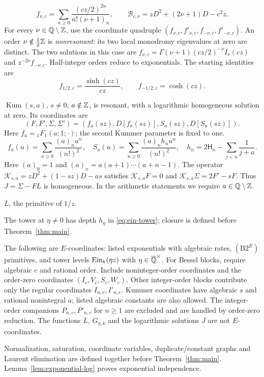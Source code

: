 \begin{description}
\begin{equation}
f_{\nu,c}=\sum_{n\ge0}\frac{(cz/2)^{2n}}{n!(\nu+1)_n},\qquad
\mathscr B_{c,\nu}=zD^2+(2\nu+1)D-c^2z.
\end{equation}
For every $\nu\in\mathbb{Q}\setminus\mathbb{Z}$, use the coordinate quadruple
$(f_{\nu,c},f'_{\nu,c},f_{-\nu,c},f'_{-\nu,c})$.
An order $\nu\notin\tfrac12\mathbb{Z}$ is \emph{nonresonant}: its two local
monodromy eigenvalues at zero are distinct.
The two solutions in this case are
$f_{\nu,c}=\Gamma(\nu+1)(cz/2)^{-\nu}I_\nu(cz)$ and
$z^{-2\nu}f_{-\nu,c}$. Half-integer orders reduce to exponentials.
The starting identities are
\[ f_{1/2,c}=\frac{\sinh(cz)}{cz},\qquad f_{-1/2,c}=\cosh(cz). \]
\item[(B4)] $\operatorname{Kum}(s,a)$, $s\ne0$, $a\notin\mathbb{Z}$, is resonant, with a
logarithmic homogeneous solution at zero. Its coordinates are
\[ (F,F',\Sigma,\Sigma')=(f_a(sz),D[f_a(sz)],S_a(sz),D[S_a(sz)]). \]
Here $f_a={}_1F_1(a;1;\cdot)$; the second Kummer parameter is fixed to one.
\begin{equation}\label{eq:kummer-block}
f_a(u)=\sum_{n\ge0}\frac{(a)_nu^n}{(n!)^2},\quad
S_a(u)=\sum_{n\ge0}\frac{(a)_nh_nu^n}{(n!)^2},\quad
h_n=2\mathsf H_n-\sum_{j<n}\frac1{j+a}.
\end{equation}
Here $(a)_0=1$ and $(a)_n=a(a+1)\cdots(a+n-1)$.
The operator $\mathscr K_{s,a}=zD^2+(1-sz)D-as$ satisfies
$\mathscr K_{s,a}F=0$ and $\mathscr K_{s,a}\Sigma=2F'-sF$. Thus $J=\Sigma-FL$ is
homogeneous. In the arithmetic statements we require $a\in\mathbb{Q}\setminus\mathbb{Z}$.
\item[(B5)] $L$, the primitive of $1/z$.
\end{description}
The tower at $\eta\ne0$ has depth $h_\eta$ in \eqref{eq:ein-tower};
closure is defined before Theorem~\ref{thm:main}.

The following are $E$-coordinates: listed exponentials with algebraic
rates, $(\mathrm{B2}^E)$ primitives, and tower levels $\operatorname{Ein}_k(\eta z)$
with $\eta\in{\overline{\mathbb{Q}}}^\times$.
For Bessel blocks, require algebraic $c$ and rational order.
Include noninteger-order coordinates and the order-zero coordinates
$(I_c,V_c,S_c,W_c)$.
Other integer-order blocks contribute only the regular coordinates
$I_{n,c},I'_{n,c}$.
Kummer coordinates have algebraic $s$ and rational nonintegral $a$;
listed algebraic constants are also allowed. The integer-order
companions $P_{n,c},P'_{n,c}$ for $n\ge1$ are excluded and are handled
by order-zero reduction. The functions $L$, $G_{\eta,k}$ and
the logarithmic solutions $J$ are not $E$-coordinates.

Normalization, saturation, coordinate variables, duplicate/constant
graphs and Laurent elimination are defined together before
Theorem~\ref{thm:main}. Lemma~\ref{lem:exponential-log} proves
exponential independence.
